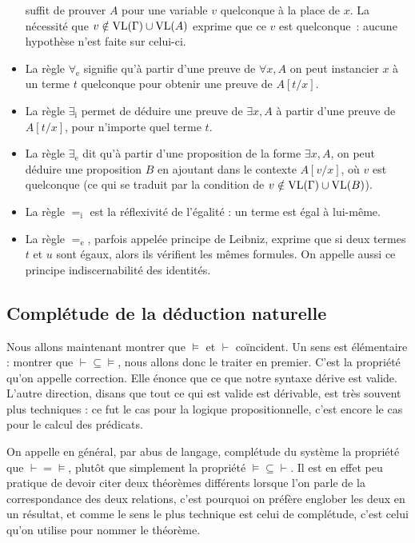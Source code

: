 \begin{itemize}
  suffit de prouver $A$ pour une variable $v$ quelconque à la place de $x$. La
  nécessité que $v\notin\operatorname{VL}(\Gamma)\cup\operatorname{VL}(A)$ exprime que ce $v$ est
  quelconque~: aucune hypothèse n'est faite sur celui-ci.
\item La règle $\forall_\mathrm e$ signifie qu'à partir d'une preuve de
  $\forall x, A$ on peut instancier $x$ à un terme $t$ quelconque pour obtenir
  une preuve de $A[t/x]$.
\item La règle $\exists_\mathrm i$ permet de déduire une preuve de $\exists x,A$
  à partir d'une preuve de $A[t/x]$, pour n'importe quel terme $t$.
\item La règle $\exists_\mathrm e$ dit qu'à partir d'une proposition de la forme
  $\exists x, A$, on peut déduire une proposition $B$ en ajoutant dans le
  contexte $A[v/x]$, où $v$ est quelconque (ce qui se traduit par la condition
  de $v\notin\operatorname{VL}(\Gamma)\cup\operatorname{VL}(B)$).
\item La règle $=_\mathrm i$ est la réflexivité de l'égalité : un terme est
  égal à lui-même.
\item La règle $=_\mathrm e$, parfois appelée principe de Leibniz, exprime que
  si deux termes $t$ et $u$ sont égaux, alors ils vérifient les mêmes formules.
  On appelle aussi ce principe \og indiscernabilité des identités\fg{}.
\end{itemize}

\subsection[Théorème de complétude]{Complétude de la déduction naturelle}

Nous allons maintenant montrer que $\vDash$ et $\vdash$ coïncident. Un sens est
élémentaire : montrer que $\vdash \subseteq\vDash$, nous allons donc le traiter
en premier. C'est la propriété qu'on appelle correction. Elle énonce que ce que
notre syntaxe dérive est valide. L'autre direction, disans que tout ce qui est
valide est dérivable, est très souvent plus techniques : ce fut le cas pour
la logique propositionnelle, c'est encore le cas pour le calcul des prédicats.

On appelle en général, par abus de langage, complétude du système la propriété
que $\vdash = \vDash$, plutôt que simplement la propriété
$\vDash\subseteq\vdash$. Il est en effet peu pratique de devoir citer deux
théorèmes différents lorsque l'on parle de la correspondance des deux relations,
c'est pourquoi on préfère englober les deux en un résultat, et comme le sens le
plus technique est celui de complétude, c'est celui qu'on utilise pour nommer le
théorème.

